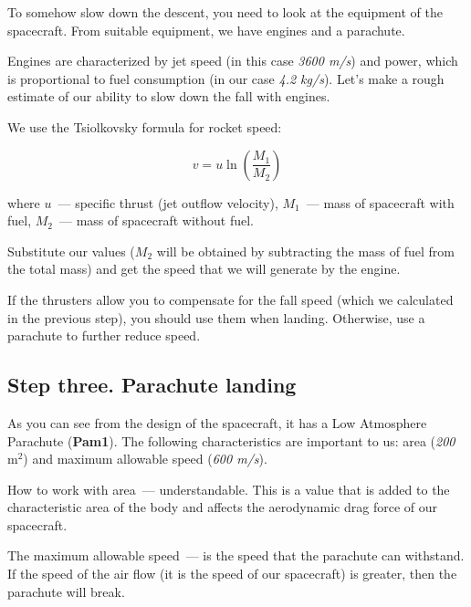 \documentclass[12pt,a4paper]{article}
\begin{document}
To somehow slow down the descent, you need to look at the equipment of the spacecraft. From suitable equipment, we have engines and a parachute.

Engines are characterized by jet speed (in this case \emph{3600 m/s}) and power, which is proportional to fuel consumption (in our case \emph{4.2 kg/s}). Let's make a rough estimate of our ability to slow down the fall with engines.

We use the Tsiolkovsky formula for rocket speed:

$$
v = u \ln\left(\frac{M_1}{M_2}\right)
$$

where $u$~--- specific thrust (jet outflow velocity), $M_1$~--- mass of spacecraft with fuel, $M_2$~--- mass of spacecraft without fuel.

Substitute our values ($M_2$ will be obtained by subtracting the mass of fuel from the total mass) and get the speed that we will generate by the engine.

\hfill

\noindent{}

\hfill

If the thrusters allow you to compensate for the fall speed (which we calculated in the previous step), you should use them when landing. Otherwise, use a parachute to further reduce speed.

\subsection{Step three. Parachute landing}

As you can see from the design of the spacecraft, it has a Low Atmosphere Parachute (\textbf{Pam1}). The following characteristics are important to us: area (\emph{200 $\text{m}^2$}) and maximum allowable speed (\emph{600 m/s}).

How to work with area~--- understandable. This is a value that is added to the characteristic area of the body and affects the aerodynamic drag force of our spacecraft.

The maximum allowable speed~--- is the speed that the parachute can withstand. If the speed of the air flow (it is the speed of our spacecraft) is greater, then the parachute will break.
\end{document}
